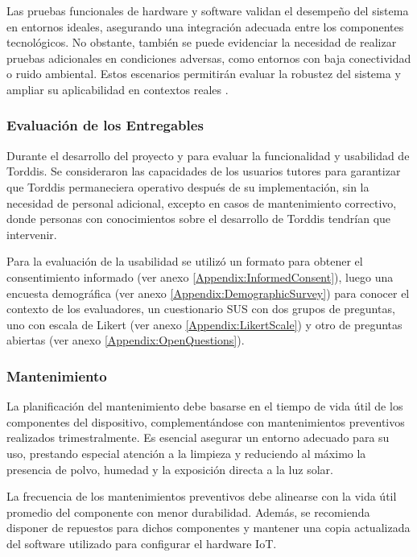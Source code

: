 \documentclass[a4paper,fleqn]{cas-sc}
\begin{document}
				Las pruebas funcionales de hardware y software validan el desempeño del sistema en entornos ideales, asegurando una integración adecuada entre los componentes tecnológicos. No obstante, también se puede evidenciar la necesidad de realizar pruebas adicionales en condiciones adversas, como entornos con baja conectividad o ruido ambiental. Estos escenarios permitirán evaluar la robustez del sistema y ampliar su aplicabilidad en contextos reales \citep{Falzetti2024Promoting}.
				
			\subsubsection{Evaluación de los Entregables}
				Durante el desarrollo del proyecto y para evaluar la funcionalidad y usabilidad de Torddis. Se consideraron las capacidades de los usuarios tutores para garantizar que Torddis permaneciera operativo después de su implementación, sin la necesidad de personal adicional, excepto en casos de mantenimiento correctivo, donde personas con conocimientos sobre el desarrollo de Torddis tendrían que intervenir.
			
				Para la evaluación de la usabilidad se utilizó un formato para obtener el consentimiento informado (ver anexo \ref{Appendix:InformedConsent}), luego una encuesta demográfica (ver anexo \ref{Appendix:DemographicSurvey}) para conocer el contexto de los evaluadores, un cuestionario SUS con dos grupos de preguntas, uno con escala de Likert (ver anexo \ref{Appendix:LikertScale}) y otro de preguntas abiertas (ver anexo \ref{Appendix:OpenQuestions}).
			
			\subsubsection{Mantenimiento}		
				La planificación del mantenimiento debe basarse en el tiempo de vida útil de los componentes del dispositivo, complementándose con mantenimientos preventivos realizados trimestralmente. Es esencial asegurar un entorno adecuado para su uso, prestando especial atención a la limpieza y reduciendo al máximo la presencia de polvo, humedad y la exposición directa a la luz solar.
				
				La frecuencia de los mantenimientos preventivos debe alinearse con la vida útil promedio del componente con menor durabilidad. Además, se recomienda disponer de repuestos para dichos componentes y mantener una copia actualizada del software utilizado para configurar el hardware IoT.
				
\end{document}
